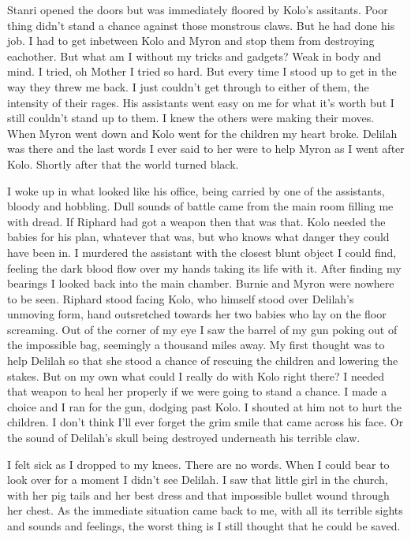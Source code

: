 Stanri opened the doors but was immediately floored by Kolo's assitants. Poor thing didn't stand a chance against those monstrous claws. But he had done his job. I had to get inbetween Kolo and Myron and stop them from destroying eachother. But what am I without my tricks and gadgets? Weak in body and mind. I tried, oh Mother I tried so hard. But every time I stood up to get in the way they threw me back. I just couldn't get through to either of them, the intensity of their rages. His assistants went easy on me for what it's worth but I still couldn't stand up to them. I knew the others were making their moves. When Myron went down and Kolo went for the children my heart broke. Delilah was there and the last words I ever said to her were to help Myron as I went after Kolo. Shortly after that the world turned black.\medskip

I woke up in what looked like his office, being carried by one of the assistants, bloody and hobbling. Dull sounds of battle came from the main room filling me with dread. If Riphard had got a weapon then that was that. Kolo needed the babies for his plan, whatever that was, but who knows what danger they could have been in. I murdered the assistant with the closest blunt object I could find, feeling the dark blood flow over my hands taking its life with it. After finding my bearings I looked back into the main chamber. Burnie and Myron were nowhere to be seen. Riphard stood facing Kolo, who himself stood over Delilah's unmoving form, hand outsretched towards her two babies who lay on the floor screaming. Out of the corner of my eye I saw the barrel of my gun poking out of the impossible bag, seemingly a thousand miles away. My first thought was to help Delilah so that she stood a chance of rescuing the children and lowering the stakes. But on my own what could I really do with Kolo right there? I needed that weapon to heal her properly if we were going to stand a chance. I made a choice and I ran for the gun, dodging past Kolo. I shouted at him not to hurt the children. I don't think I'll ever forget the grim smile that came across his face. Or the sound of Delilah's skull being destroyed underneath his terrible claw.\medskip

I felt sick as I dropped to my knees. There are no words. When I could bear to look over for a moment I didn't see Delilah. I saw that little girl in the church, with her pig tails and her best dress and that impossible bullet wound through her chest. As the immediate situation came back to me, with all its terrible sights and sounds and feelings, the worst thing is I still thought that he could be saved.\medskip

